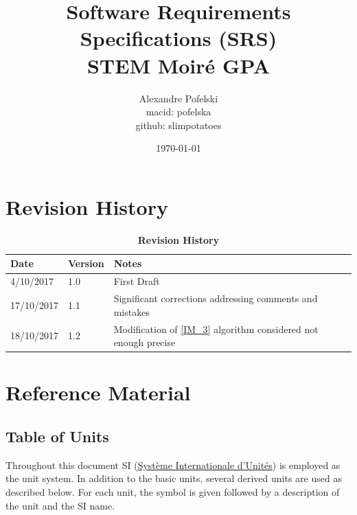 \documentclass[12pt]{article}
\begin{document}
\title{Software Requirements Specifications (SRS) \\
STEM Moir{\'e} GPA} 
\author{Alexandre Pofelski \\
		macid: pofelska \\
		github: slimpotatoes}
\date{\today}

\maketitle

\clearpage

\tableofcontents

\clearpage

\section{Revision History}

\begin{table}[h]
\caption{\bf Revision History}
\begin{tabularx}{\textwidth}{p{3cm}p{2cm}X}
\toprule {\bf Date} & {\bf Version} & {\bf Notes}\\
\midrule
4/10/2017 & 1.0 & First Draft\\
17/10/2017 & 1.1 & Significant corrections addressing comments and mistakes\\
18/10/2017 & 1.2 & Modification of \cref{IM_3} algorithm considered not enough precise\\
\bottomrule
\end{tabularx}
\end{table}

\clearpage

\section{Reference Material}

\subsection{Table of Units}

Throughout this document SI 
(\href{<https://physics.nist.gov/cuu/Units/index.html>}{Syst\`{e}me 
Internationale d'Unit\'{e}s}) is employed as the unit system. In addition to the 
basic units, several derived units are used as described below.  For each unit, 
the symbol is given followed by a description of the unit and the SI name.\par 
\bigskip
\end{document}
